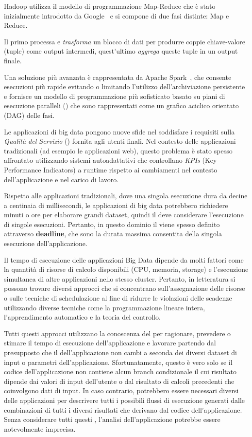 Hadoop utilizza il modello di programmazione Map-Reduce che è stato inizialmente introdotto da Google~\cite{misc:GoogleMapReduce} e si compone di due fasi distinte: Map e Reduce.


Il primo processa e \textit{trasforma} un blocco di dati per produrre coppie chiave-valore (tuple) come output intermedi, quest'ultimo \textit{aggrega} queste tuple in un output finale.

Una soluzione più avanzata è rappresentata da Apache Spark~\cite{misc:ApacheSpark}, che consente esecuzioni più rapide evitando o limitando l'utilizzo dell'archiviazione persistente e fornisce un modello di programmazione più sofisticato basato su piani di esecuzione paralleli (\plans) che sono rappresentati come un grafico aciclico orientato (DAG) delle fasi.

Le applicazioni di big data pongono nuove sfide nel soddisfare i requisiti sulla \textit{Qualità del Servizio} (\qos) fornita agli utenti finali. Nel contesto delle applicazioni tradizionali (ad esempio le applicazioni web), questo problema è stato spesso affrontato utilizzando sistemi autoadattativi che controllano \textit {KPIs} (Key Performance Indicators) a runtime rispetto ai cambiamenti nel contesto dell'applicazione e nel carico di lavoro.

Rispetto alle applicazioni tradizionali, dove una singola esecuzione dura da decine a centinaia di millisecondi, le applicazioni di big data potrebbero richiedere minuti o ore per elaborare grandi dataset, quindi il  \qos deve considerare l'esecuzione di singole esecuzioni. Pertanto, in questo dominio il \qos viene spesso definito attraverso \textbf{deadline}, che sono la durata massima consentita della singola esecuzione  dell'applicazione.

Il tempo di esecuzione delle applicazioni Big Data dipende da molti fattori come la quantità di risorse di calcolo disponibili (CPU, memoria, storage) e l'esecuzione simultanea di altre applicazioni nello stesso cluster. Pertanto, in letteratura si possono trovare diversi approcci \cite{Verma2011, Hindman2011, Cheng2015} che si concentrano sull'assegnazione delle risorse o sulle tecniche di schedulazione al fine di ridurre le violazioni delle scadenze utilizzando diverse tecniche come la programmazione lineare intera, l'apprendimento automatico e la teoria del controllo.

Tutti questi approcci utilizzano la conoscenza del \plan per ragionare, prevedere o stimare il tempo di esecuzione dell'applicazione e lavorare partendo dal presupposto che il \plan dell'applicazione non cambi a seconda dei diversi dataset di input o parametri dell'applicazione. Sfortunatamente, questo è vero solo se il codice dell'applicazione non contiene alcun branch condizionale il cui risultato dipende dai valori di input dell'utente o dal risultato di calcoli precedenti che coinvolgono dati di input. In caso contrario, potrebbero essere necessari diversi \plans delle applicazioni per descrivere tutti i possibili flussi di esecuzione generati dalle combinazioni di tutti i diversi risultati che  derivano dal codice dell'applicazione. Senza considerare tutti questi \plans, l'analisi dell'applicazione potrebbe essere notevolmente imprecisa.

